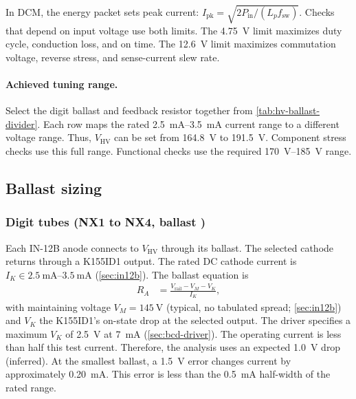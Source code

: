 In DCM, the energy packet sets peak current:
$I_{\mathrm{pk}} = \sqrt{2P_{\mathrm{in}}/(L_p f_{\mathrm{sw}})}$. Checks that
depend on input voltage use both limits. The \SI{4.75}{\volt} limit maximizes
duty cycle, conduction loss, and on time. The \SI{12.6}{\volt} limit maximizes
commutation voltage, reverse stress, and sense-current slew rate.

\paragraph{Achieved tuning range.}\label{sec:hv-achieved-range}
Select the digit ballast and feedback resistor together from
\cref{tab:hv-ballast-divider}. Each row maps the rated
\SIrange{2.5}{3.5}{\milli\ampere} current range to a different voltage range.
Thus, $V_{\mathrm{HV}}$ can be set from \SI{164.8}{\volt} to
\SI{191.5}{\volt}. Component stress checks use this full range. Functional
checks use the required \SIrange{170}{185}{\volt} range.

\subsection{Ballast sizing}\label{sec:hv-load}

\subsubsection{Digit tubes (NX1 to NX4, ballast )}\label{sec:hv-load-digit}

Each IN-12B anode connects to $V_{\mathrm{HV}}$ through its ballast. The
selected cathode returns through a K155ID1 output. The rated DC cathode current
is $I_K \in \SIrange{2.5}{3.5}{\milli\ampere}$ (\cref{sec:in12b}). The ballast
equation is
\begin{align*}
  R_A &= \frac{V_{\mathrm{rail}} - V_M - V_K}{I_K},
\end{align*}
with maintaining voltage $V_M = \SI{145}{\volt}$ (typical, no tabulated spread;
\cref{sec:in12b}) and $V_K$ the K155ID1's on-state drop at the selected output.
The driver specifies a maximum $V_K$ of \SI{2.5}{\volt} at
\SI{7}{\milli\ampere} (\cref{sec:bcd-driver}). The operating current is less
than half this test current. Therefore, the analysis uses an expected
\SI{1.0}{\volt} drop (inferred). At the smallest ballast, a
\SI{1.5}{\volt} error changes current by approximately
\SI{0.20}{\milli\ampere}. This error is less than the
\SI{0.5}{\milli\ampere} half-width of the rated range.

